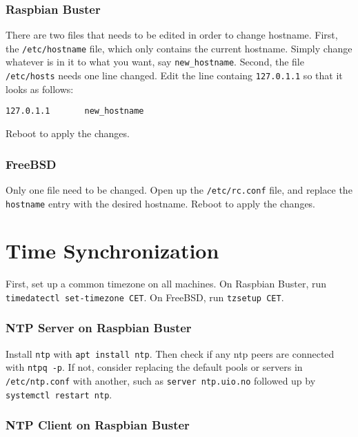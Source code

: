 \subsubsection{Raspbian Buster}

There are two files that needs to be edited in order to change hostname. First, the \lstinline{/etc/hostname} file, which only contains the current hostname. Simply change whatever is in it to what you want, say \lstinline{new_hostname}. Second, the file \lstinline{/etc/hosts} needs one line changed. Edit the line containg \lstinline{127.0.1.1} so that it looks as follows:

\begin{verbatim}
127.0.1.1       new_hostname
\end{verbatim}

Reboot to apply the changes.

\subsubsection{FreeBSD}

Only one file need to be changed. Open up the \lstinline{/etc/rc.conf} file, and replace the \lstinline{hostname} entry with the desired hostname. Reboot to apply the changes.


\section{Time Synchronization} \label{time_sync}

First, set up a common timezone on all machines. On Raspbian Buster, run \lstinline{timedatectl set-timezone CET}. On FreeBSD, run \lstinline{tzsetup CET}.

\subsubsection{NTP Server on Raspbian Buster}

Install \lstinline{ntp} with \lstinline{apt install ntp}. Then check if any \gls{ntp} peers are connected with \lstinline{ntpq -p}. If not, consider replacing the default pools or servers in \lstinline{/etc/ntp.conf} with another, such as \lstinline{server ntp.uio.no} followed up by \lstinline{systemctl restart ntp}.

\subsubsection{NTP Client on Raspbian Buster}

